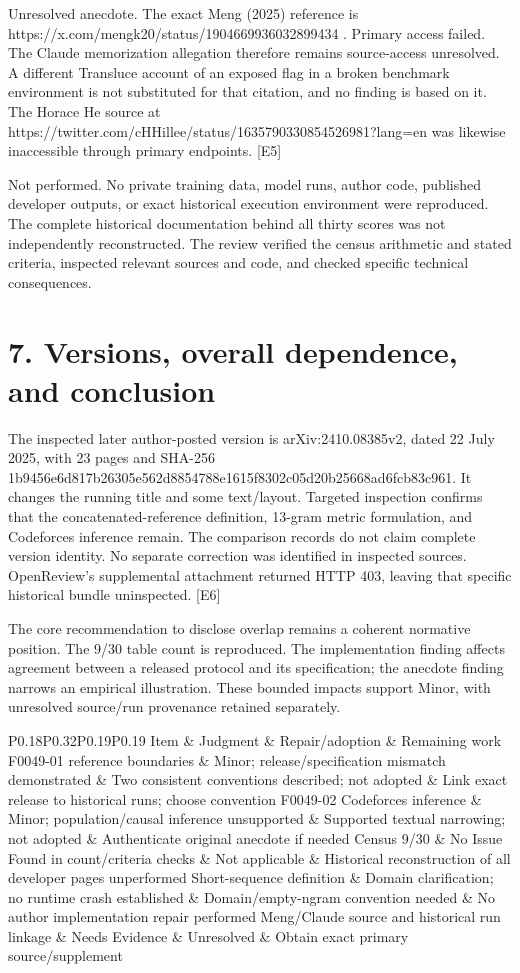 \documentclass[10pt]{article}
\begin{document}
Unresolved anecdote. The exact Meng (2025) reference is https://x.com/mengk20/status/1904669936032899434 . Primary access failed. The Claude memorization allegation therefore remains source-access unresolved. A different Transluce account of an exposed flag in a broken benchmark environment is not substituted for that citation, and no finding is based on it. The Horace He source at https://twitter.com/cHHillee/status/1635790330854526981?lang=en was likewise inaccessible through primary endpoints. [E5]\par
Not performed. No private training data, model runs, author code, published developer outputs, or exact historical execution environment were reproduced. The complete historical documentation behind all thirty scores was not independently reconstructed. The review verified the census arithmetic and stated criteria, inspected relevant sources and code, and checked specific technical consequences.\par
\section*{7. Versions, overall dependence, and conclusion}
The inspected later author-posted version is arXiv:2410.08385v2, dated 22 July 2025, with 23 pages and SHA-256 1b9456e6d817b26305e562d8854788e1615f8302c05d20b25668ad6fcb83c961. It changes the running title and some text/layout. Targeted inspection confirms that the concatenated-reference definition, 13-gram metric formulation, and Codeforces inference remain. The comparison records do not claim complete version identity. No separate correction was identified in inspected sources. OpenReview’s supplemental attachment returned HTTP 403, leaving that specific historical bundle uninspected. [E6]\par
The core recommendation to disclose overlap remains a coherent normative position. The 9/30 table count is reproduced. The implementation finding affects agreement between a released protocol and its specification; the anecdote finding narrows an empirical illustration. These bounded impacts support Minor, with unresolved source/run provenance retained separately.\par
P0.18P0.32P0.19P0.19 Item \& Judgment \& Repair/adoption \& Remaining work
F0049-01 reference boundaries \& Minor; release/specification mismatch demonstrated \& Two consistent conventions described; not adopted \& Link exact release to historical runs; choose convention
F0049-02 Codeforces inference \& Minor; population/causal inference unsupported \& Supported textual narrowing; not adopted \& Authenticate original anecdote if needed
Census 9/30 \& No Issue Found in count/criteria checks \& Not applicable \& Historical reconstruction of all developer pages unperformed
Short-sequence definition \& Domain clarification; no runtime crash established \& Domain/empty-ngram convention needed \& No author implementation repair performed
Meng/Claude source and historical run linkage \& Needs Evidence \& Unresolved \& Obtain exact primary source/supplement\par
\end{document}
